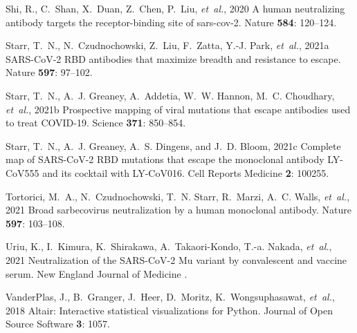 \documentclass[9pt,twocolumn,twoside]{gsajnl_modified}
\begin{document}
{\begin{thebibliography}{30}
{Shi, R., C.~Shan, X.~Duan, Z.~Chen, P.~Liu, {\em et~al.\/}}, 2020 A human
  neutralizing antibody targets the receptor-binding site of sars-cov-2. Nature
  {\bf 584}: 120--124.

{Starr, T.~N., N.~Czudnochowski, Z.~Liu, F.~Zatta, Y.-J. Park, {\em et~al.\/}},
  2021{a} {SARS-CoV-2 RBD} antibodies that maximize breadth and resistance to
  escape. Nature {\bf 597}: 97--102.

{Starr, T.~N., A.~J. Greaney, A.~Addetia, W.~W. Hannon, M.~C. Choudhary, {\em
  et~al.\/}}, 2021{b} Prospective mapping of viral mutations that escape
  antibodies used to treat {COVID-19}. Science {\bf 371}: 850--854.

{Starr, T.~N., A.~J. Greaney, A.~S. Dingens, {\rm and} J.~D. Bloom}, 2021{c}
  {Complete map of SARS-CoV-2 RBD mutations that escape the monoclonal antibody
  LY-CoV555 and its cocktail with LY-CoV016}. Cell Reports Medicine {\bf 2}:
  100255.

{Tortorici, M.~A., N.~Czudnochowski, T.~N. Starr, R.~Marzi, A.~C. Walls, {\em
  et~al.\/}}, 2021 Broad sarbecovirus neutralization by a human monoclonal
  antibody. Nature {\bf 597}: 103--108.

{Uriu, K., I.~Kimura, K.~Shirakawa, A.~Takaori-Kondo, T.-a. Nakada, {\em
  et~al.\/}}, 2021 Neutralization of the {SARS-CoV-2 Mu} variant by
  convalescent and vaccine serum. New England Journal of Medicine .

{VanderPlas, J., B.~Granger, J.~Heer, D.~Moritz, K.~Wongsuphasawat, {\em
  et~al.\/}}, 2018 Altair: Interactive statistical visualizations for {Python}.
  Journal of Open Source Software {\bf 3}: 1057.


\end{thebibliography}}
\end{document}
